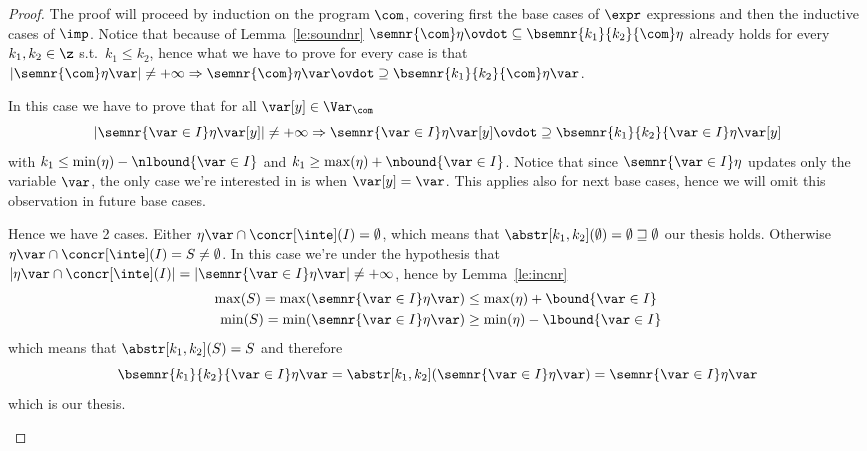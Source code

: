 \begin{proof}
  The proof will proceed by induction on the program \(\com\),
  covering first the base cases of \(\expr\) expressions and then the
  inductive cases of \(\imp\). Notice that because of
  Lemma~\ref{le:soundnr}
  \(\semnr{\com} \eta \ovdot\subseteq \bsemnr{k_1}{k_2}{\com}\eta\)
  already holds for every \(k_1, k_2 \in \z\) s.t.\ \(k_1\leq k_2\),
  hence what we have to prove for every case is that
  \(|\semnr{\com}\eta\var| \neq +\infty \Rightarrow \semnr{\com} \eta
  \var \ovdot\supseteq \bsemnr{k_1}{k_2}{\com}\eta\var\).
  \begin{inductive}
     In this case we have to prove that for all
    \(\var[y] \in \Var_{\com}\)
    \[|\semnr{\var\in I}\eta\var[y]| \neq + \infty \Rightarrow
      \semnr{\var\in I}\eta \var[y] \ovdot\supseteq
      \bsemnr{k_1}{k_2}{\var\in I}\eta\var[y]\] with
    \(k_1\leq \min(\eta) - \nlbound{\var \in I}\) and
    \(k_1\geq \max(\eta) + \nbound{\var \in I}\). Notice that since
    \(\semnr{\var \in I}\eta\) updates only the variable \(\var\), the
    only case we're interested in is when \(\var[y] = \var\). This
    applies also for next base cases, hence we will omit this
    observation in future base cases.

    \medskip

    \noindent
    Hence we have 2 cases. Either
    \(\eta\var \cap \concr[\inte](I) = \emptyset\), which means that
    \(\abstr[k_1,k_2]({\emptyset}) = \emptyset \sqsupseteq \emptyset\)
    our thesis holds. Otherwise
    \(\eta\var \cap \concr[\inte](I) = S \neq \emptyset\). In this
    case we're under the hypothesis that
    \(|\eta\var\cap\concr[\inte](I)| = |\semnr{\var\in I}\eta\var|
    \neq +\infty\), hence by Lemma~\ref{le:incnr}
    \begin{align*}
      \max(S) = \max(\semnr{\var\in I}\eta\var) & \leq \max(\eta) + \bound{\var \in I}\\
      \min(S) = \min(\semnr{\var\in I}\eta\var) & \geq \min(\eta) - \lbound{\var \in I}
    \end{align*}
    which means that \(\abstr[k_1,k_2](S) = S\) and therefore
    \begin{equation*}
      \bsemnr{k_1}{k_2}{\var\in I}\eta\var = \abstr[k_1,k_2](\semnr{\var\in I}\eta\var) = \semnr{\var\in I}\eta\var
    \end{equation*}
    which is our thesis.


\end{inductive}
\end{proof}
